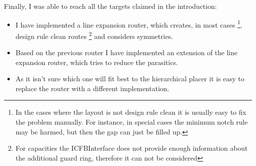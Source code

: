Finally, I was able to reach all the targets claimed in the introduction:
\begin{itemize}
\item I have implemented a line expansion router, which creates, in most cases \footnote{In the cases where the layout is not design rule clean it is usually easy to fix the problem manually. For instance, in special cases the minimum notch rule may be harmed, but then the gap can just be filled up.}, design rule clean routes \footnote{For capacities the ICFBInterface does not provide enough information about the additional guard ring, therefore it can not be considered} and considers symmetries.
\item Based on the previous router I have implemented an extension of the line expansion router, which tries to reduce the parasitics.
\item As it isn't sure which one will fit best to the hierarchical placer it is easy to replace the router with a different implementation.
\end{itemize}